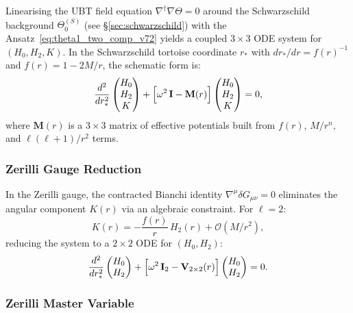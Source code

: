 \documentclass[12pt]{article}
\theoremstyle{definition}
\theoremstyle{remark}
\begin{document}
Linearising the UBT field equation $\nabla^\dagger\nabla\Theta = 0$ around
the Schwarzschild background $\Theta_0^{(S)}$ (see §\ref{sec:schwarzschild})
with the Ansatz~\eqref{eq:theta1_two_comp_v72} yields a coupled
$3\times 3$ ODE system for $(H_0, H_2, K)$.  In the Schwarzschild
tortoise coordinate $r_*$ with $dr_*/dr = f(r)^{-1}$ and
$f(r) = 1 - 2M/r$, the schematic form is:
\begin{equation}
  \frac{d^2}{dr_*^2}
  \begin{pmatrix} H_0 \\ H_2 \\ K \end{pmatrix}
  + \Bigl[\omega^2\,\mathbf{I} - \mathbf{M}(r)\Bigr]
  \begin{pmatrix} H_0 \\ H_2 \\ K \end{pmatrix} = 0,
  \label{eq:coupled_ode_3x3}
\end{equation}
where $\mathbf{M}(r)$ is a $3\times 3$ matrix of effective potentials
built from $f(r)$, $M/r^n$, and $\ell(\ell+1)/r^2$ terms.

\subsubsection{Zerilli Gauge Reduction}

In the Zerilli gauge, the contracted Bianchi identity
$\nabla^\mu\delta G_{\mu\nu} = 0$ eliminates the angular component
$K(r)$ via an algebraic constraint.  For $\ell = 2$:
\begin{equation}
  K(r) = -\frac{f(r)}{r}\,H_2(r) + \mathcal{O}(M/r^2),
  \label{eq:zerilli_gauge_K}
\end{equation}
reducing the system to a $2\times 2$ ODE for $(H_0, H_2)$:
\begin{equation}
  \frac{d^2}{dr_*^2}
  \begin{pmatrix} H_0 \\ H_2 \end{pmatrix}
  + \Bigl[\omega^2\,\mathbf{I}_2 - \mathbf{V}_{2\times2}(r)\Bigr]
  \begin{pmatrix} H_0 \\ H_2 \end{pmatrix} = 0.
  \label{eq:coupled_ode_2x2}
\end{equation}

\subsubsection{Zerilli Master Variable}
\end{document}
